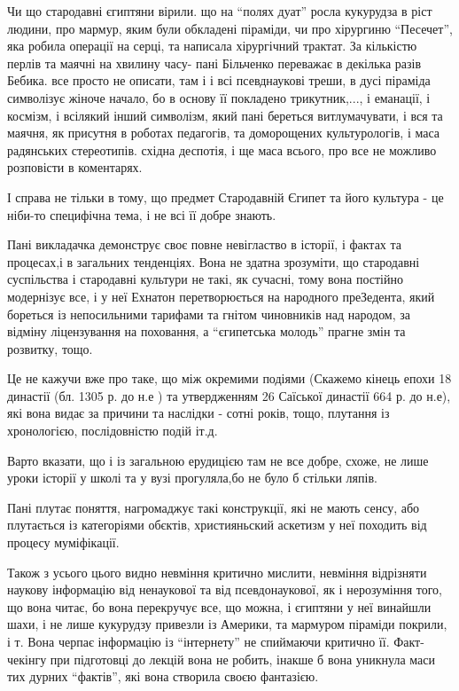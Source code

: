 Чи що стародавні єгиптяни вірили. що на \enquote{полях дуат} росла кукурудза в ріст
людини, про мармур, яким були обкладені піраміди, чи про хірургиню \enquote{Песечет},
яка робила операції на серці, та написала хірургічний трактат. За кількістю
перлів та маячні на хвилину часу- пані Більченко переважає в декілька разів
Бебика. все просто не описати,  там і  і всі псевднаукові треши, в дусі
піраміда символізує жіноче начало, бо в основу її покладено трикутник,..., і
еманації,  і космізм, і всілякий інший символізм, який пані береться
витлумачувати, і вся та маячня, як присутня в роботах педагогів, та доморощених
культурологів, і маса радянських стереотипів.  східна деспотія, і ще маса
всього, про все не можливо розповісти в коментарях.

І справа не тільки в тому, що предмет Стародавній Єгипет та його культура - це
ніби-то специфічна тема, і не всі її добре знають.

Пані викладачка демонструє своє повне невігластво в історії, і  фактах та
процесах,і  в загальних тенденціях. Вона не здатна зрозуміти, що стародавні
суспільства і стародавні культури не такі, як сучасні, тому вона постійно
модернізує все, і у неї Ехнатон перетворюється на народного преЗедента, який
бореться із непосильними тарифами та гнітом чиновників над народом, за відміну
ліцензування на поховання, а \enquote{єгипетська молодь} прагне змін та розвитку, тощо.

Це не кажучи вже про таке, що між окремими подіями (Скажемо кінець епохи 18
династії (бл. 1305 р. до н.е ) та утвердженням 26 Саїської династії 664 р. до
н.е), які вона видає за причини та наслідки -  сотні років, тощо, плутання із
хронологією, послідовністю подій іт.д.

Варто вказати, що і із загальною ерудицією там не все добре, схоже, не лише
уроки історії у школі та у вузі прогуляла,бо не було б стільки ляпів.

Пані плутає поняття,  нагромаджує такі конструкції, які не мають сенсу, або
плутається із категоріями обєктів, християньский  аскетизм у неї походить від
процесу муміфікації.

Також з усього цього видно невміння критично мислити, невміння відрізняти
наукову інформацію від ненаукової та від псевдонаукової, як і нерозуміння того,
що вона читає, бо вона перекручує все, що можна, і єгиптяни у неї винайшли
шахи, і не лише кукурудзу привезли із Америки, та мармуром піраміди покрили, і
т. Вона черпає інформацію із \enquote{інтернету} не спиймаючи критично її.
Факт-чекінгу при підготовці до лекцій вона не робить, інакше б вона уникнула
маси тих дурних \enquote{фактів}, які вона створила своєю фантазією.

